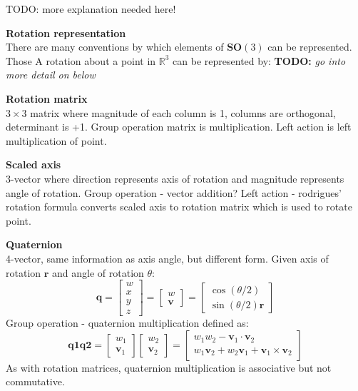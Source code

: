 		TODO: more explanation needed here!
		
		\textbf{Rotation representation}\\		
		There are many conventions by which elements of $\mathbf{SO}(3)$ can be represented. Those  A rotation about a point in $\mathbb{R}^3$ can be represented by: \textbf{TODO:} \textit{go into more detail on below}
		
		\textbf{Rotation matrix}\\
		$3 \times 3$ matrix where magnitude of each column is 1, columns are orthogonal, determinant is +1. Group operation matrix is multiplication. Left action is left multiplication of point. 
		
		\textbf{Scaled axis}\\
		3-vector where direction represents axis of rotation and magnitude represents angle of rotation. Group operation - vector addition? Left action - rodrigues' rotation formula converts scaled axis to rotation matrix which is used to rotate point.
				
		\textbf{Quaternion}\\
		4-vector, same information as axis angle, but different form. Given axis of rotation $\mathbf{r}$ and angle of rotation $\theta$:
		\begin{equation}
			\mathbf{q} = 
			\begin{bmatrix}
				w \\
				x \\
				y \\
				z
			\end{bmatrix}
			 = 
			 \begin{bmatrix}
 				w \\
 				\mathbf{v}
			 \end{bmatrix}
			 =
			 \begin{bmatrix}
			 	\cos(\theta/2) \\
			 	\sin(\theta/2)\mathbf{r}
			 \end{bmatrix}
		\end{equation}
		Group operation - quaternion multiplication defined as:
		\begin{equation}
			\mathbf{q1}\mathbf{q2} =
			\begin{bmatrix}
			 	w_1 \\
			 	\mathbf{v}_1
			\end{bmatrix} 
			\begin{bmatrix}
			 	w_2 \\
			 	\mathbf{v}_2
			\end{bmatrix} 
			=
			\begin{bmatrix}
			 	w_1w_2 - \mathbf{v}_1 \cdot \mathbf{v}_2 \\
			 	w_1\mathbf{v}_2 + w_2\mathbf{v}_1 + \mathbf{v}_1 \times \mathbf{v}_2
			\end{bmatrix} 
		\end{equation} 
		As with rotation matrices, quaternion multiplication is associative but not commutative.
		
